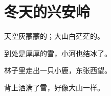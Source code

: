\documentclass[12pt,UTF-8,openany]{ctexbook}
\begin{document}
\chapter{冬天的兴安岭}

\begin{large}
    
    天空灰蒙蒙的；大山白茫茫的。
    
    到处是厚厚的雪，小河也结冰了。
    
    林子里走出一只小鹿，东张西望。
    
    背上洒满了雪，好像大山一样。
    
\end{large}


\clearpage

\begin{center}
    
\end{center}


\hanzibox{}\hanzibox{}\hanzibox{}\hanzibox{}\hspace{1em}\hanzibox{}\hanzibox{}\hanzibox{}\hanzibox{}

\hanzibox{}\hanzibox{}\hanzibox{}\hanzibox{}\hspace{1em}\hanzibox{}\hanzibox{}\hanzibox{}\hanzibox{}

\hanzibox{}\hanzibox{}\hanzibox{}\hanzibox{}\hspace{1em}\hanzibox{}\hanzibox{}\hanzibox{}\hanzibox{}
\end{document}
